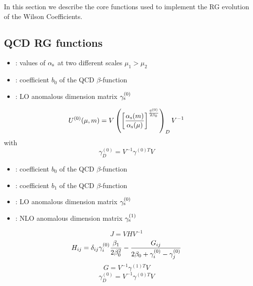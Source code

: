 
In this section we describe the core functions used to implement the RG evolution of the 
Wilson Coefficients.

\subsection{QCD RG functions}


\begin{itemize}
\item {}: values of $\alpha_{\mathrm s}$ at two different scales $\mu_1>\mu_2$
\item {}: coefficient $b_0$ of the QCD $\beta$-function
\item {}: LO anomalous dimension matrix $\gamma_{\mathrm s}^{(0)}$ 
\end{itemize}

\begin{equation}
\label{u0vd} U^{(0)}(\mu,m)= V
\left({\left[{\alpha_{\mathrm s}(m)\over\alpha_{\mathrm s}(\mu)}\right]}^{{\vec\gamma^{(0)}\over 2\beta_0}}
   \right)_D V^{-1}   
\end{equation}
with
\begin{equation}
\label{ga0d} \gamma^{(0)}_D=V^{-1} {\gamma^{(0)T}} V  
\end{equation}


\begin{itemize}
\item {}: coefficient $b_0$ of the QCD $\beta$-function
\item {}: coefficient $b_1$ of the QCD $\beta$-function
\item {}: LO anomalous dimension matrix $\gamma_{\mathrm s}^{(0)}$
\item {}: NLO anomalous dimension matrix $\gamma_{\mathrm s}^{(1)}$
\end{itemize}

\begin{equation}
\label{jvs} J=V H V^{-1}   
\end{equation}
\begin{equation}
\label{sij} H_{ij}=\delta_{ij}\gamma^{(0)}_i{\beta_1\over 2\beta^2_0}-
    {G_{ij}\over 2\beta_0+\gamma^{(0)}_i-\gamma^{(0)}_j}  
\end{equation}
\begin{equation}
\label{gvg1} G=V^{-1} {\gamma^{(1)T}} V   
\end{equation}
\begin{equation}
\label{ga0d} \gamma^{(0)}_D=V^{-1} {\gamma^{(0)T}} V  
\end{equation}

